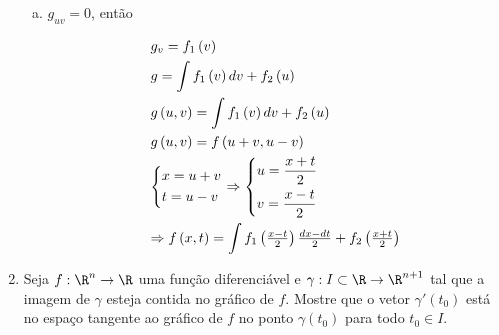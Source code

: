 \documentclass{book}
\begin{document}
\begin{enumerate}
\begin{sol}
\begin{enumerate}[(a)]
    \item $g_{uv} = 0$, ent\~ao

\[
\begin{gathered}
  g_v  = f_1 \left( v \right) \hfill \\
  g = \int {f_1 \left( v \right)dv}  + f_2 \left( u \right) \hfill \\
  g\left( {u,v} \right) = \int {f_1 \left( v \right)dv}  + f_2 \left( u \right) \hfill \\
  g\left( {u,v} \right) = f\left( {u + v,u - v} \right) \hfill \\
  \left\{ \begin{gathered}
  x = u + v \hfill \\
  t = u - v \hfill \\
\end{gathered}  \right. \Rightarrow \left\{ \begin{gathered}
  u = \frac{{x + t}}
{2} \hfill \\
  v = \frac{{x - t}}
{2} \hfill \\
\end{gathered}  \right. \hfill \\
   \Rightarrow f\left( {x,t} \right) = \int {f_1 \left( {\tfrac{{x - t}}
{2}} \right)\tfrac{{dx - dt}}
{2}}  + f_2 \left( {\tfrac{{x + t}}
{2}} \right) \hfill \\
\end{gathered}
\]

  \end{enumerate}
\end{sol}

  \item Seja $f:\R^n \to \R$ uma fun\c{c}\~ao diferenci\'avel e $\gamma :I \subset \R \to \R^{n + 1}$ tal que a imagem de $\gamma$ esteja contida no gr\'afico de $f$. Mostre que o vetor $\gamma '\left( {t_0 } \right)$ est\'a no espa\c{c}o tangente ao gr\'afico de $f$ no ponto $\gamma \left( {t_0 } \right)$ para todo $t_0 \in I$.


\end{enumerate}
\end{document}
